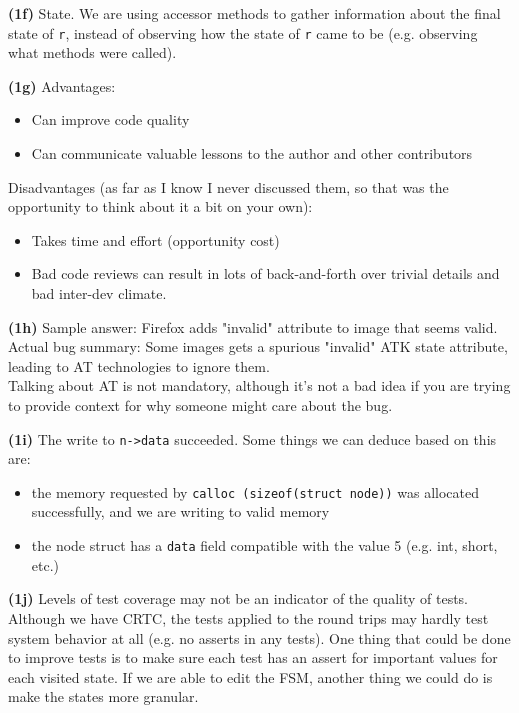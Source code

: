 \documentclass[11pt,onecolumn,letterpaper]{article}
\newcounter{qNum}
\newcommand{\q}[1]{%
\textbf{(#1)}\stepcounter{qNum}}
\begin{document}
\q{1f}
State. We are using accessor methods to gather information
about the final state of {\tt r}, instead of observing how the state
of {\tt r} came to be (e.g. observing what methods were called).

\q{1g}
Advantages:
\begin{itemize}[noitemsep]
\item Can improve code quality
\item Can communicate valuable lessons to the author and other contributors
\end{itemize}

Disadvantages (as far as I know I never discussed them, so that was the opportunity to think about it a bit on your own):
\begin{itemize}[noitemsep]
\item Takes time and effort (opportunity cost)
\item Bad code reviews can result in lots of back-and-forth over trivial details and bad inter-dev climate.
\end{itemize}

\q{1h} 
Sample answer: Firefox adds "invalid" attribute to image that seems valid.\\
Actual bug summary: Some images gets a spurious "invalid" ATK state attribute, leading to AT technologies to ignore them.\\[1em]

Talking about AT is not mandatory, although it's not a bad idea if you are trying to provide context for why someone might care
about the bug.

\q{1i}
The write to {\tt n->data} succeeded. Some things we can deduce based on this are:
\begin{itemize}[noitemsep]
\item the memory requested by {\tt calloc (sizeof(struct node))} was allocated successfully,
and we are writing to valid memory
\item the node struct has a {\tt data} field compatible with the value 5 (e.g. int, short, etc.)
\end{itemize}

\q{1j}
Levels of test coverage may not be an indicator of the quality of tests. Although we have
CRTC, the tests applied to the round trips may hardly test system behavior at all (e.g. no
asserts in any tests). One thing that could be done to improve tests is to make sure
each test has an assert for important values for each visited state. If we are able to
edit the FSM, another thing we could do is make the states more granular.
\end{document}
